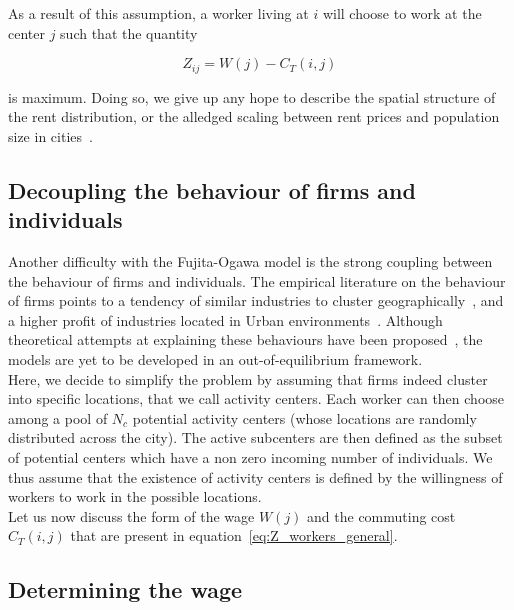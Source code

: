 As a result of this assumption, a worker living at $i$
will choose to work at the center $j$ such that the quantity
 
\begin{equation}
    Z_{ij} = W(j) - C_T(i,j)
    \label{eq:Z_workers_general}
\end{equation}

is maximum. Doing so, we give up any hope to describe the spatial structure of the rent
distribution, or the alledged scaling between rent prices and population size in
cities~\cite{Bettencourt:2013}.

\subsection{Decoupling the behaviour of firms and individuals}
\label{sub:decoupling_the_dynamics_of_}

Another difficulty with the Fujita-Ogawa model is the strong coupling between
the behaviour of firms and individuals. The empirical literature on the
behaviour of firms points to a tendency of similar industries to cluster
geographically~\cite{Duranton:2005, Marcon:2009}, and a higher
profit of industries located in Urban environments~\cite{Melo:2009}. Although
theoretical attempts at explaining these behaviours have been
proposed~\cite{Duranton:2004}, the models are yet to be developed in an
out-of-equilibrium framework.\\

Here, we decide to simplify the problem by assuming that firms indeed cluster
into specific locations, that we call activity centers. Each worker can then
choose among a pool of $N_c$ potential activity centers (whose locations are
randomly distributed across the city). The active subcenters are then
defined as the subset of potential centers which have a non zero incoming number
of individuals. We thus assume that the existence of activity centers is defined
by the willingness of workers to work in the possible locations.\\


Let us now discuss the form of the wage $W(j)$ and the commuting cost $C_T(i,j)$ that are
present in equation~\ref{eq:Z_workers_general}. 

\subsection{Determining the wage}
\label{sub:determining_the_wage}

